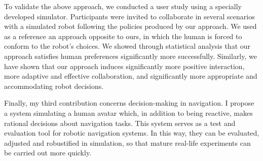 To validate the above approach, we conducted a user study using a specially developed simulator. Participants were invited to collaborate in several scenarios with a simulated robot following the policies produced by our approach. We used as a reference an approach opposite to ours, in which the human is forced to conform to the robot's choices. We showed through statistical analysis that our approach satisfies human preferences significantly more successfully. Similarly, we have shown that our approach induces significantly more positive interaction, more adaptive and effective collaboration, and significantly more appropriate and accommodating robot decisions.

Finally, my third contribution concerns decision-making in navigation. I propose a system simulating a human avatar which, in addition to being reactive, makes rational decisions about navigation tasks. This system serves as a test and evaluation tool for robotic navigation systems. In this way, they can be evaluated, adjusted and robustified in simulation, so that mature real-life experiments can be carried out more quickly.
